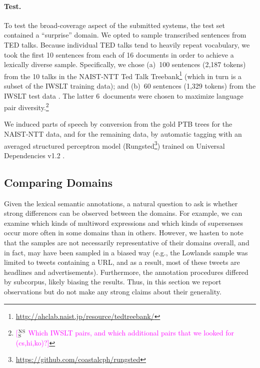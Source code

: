 \documentclass[11pt,letterpaper]{article}
\newcommand{\ensuretext}[1]{#1}
\newcommand{\nssmarker}{\ensuretext{\textcolor{magenta}{\ensuremath{^{\textsc{NS}}_{\textsc{S}}}}}}
\newcommand{\arkcomment}[3]{\ensuretext{\textcolor{#3}{[#1 #2]}}}
\newcommand{\nss}[1]{\arkcomment{\nssmarker}{#1}{magenta}}
\begin{document}
\paragraph{Test.}
To test the broad-coverage aspect of the submitted systems, the test set contained a ``surprise'' domain. 
We opted to sample transcribed sentences from TED talks. 
Because individual TED talks tend to heavily repeat vocabulary, we took the first 10 sentences 
from each of 16 documents in order to achieve a lexically diverse sample. 
Specifically, we chose 
(a)~100 sentences (2,187 tokens) from the 10 talks in the 
NAIST-NTT Ted Talk Treebank\footnote{\url{http://ahclab.naist.jp/resource/tedtreebank/}} \citep{neubig-2014naist} 
(which in turn is a subset of the IWSLT training data); 
and (b)~60 sentences (1,329 tokens) from the IWSLT test data \citep{cettolo-2012wit3}.
The latter 6~documents were chosen to maximize language pair diversity.\footnote{\nss{Which IWSLT pairs, and which additional pairs that we looked for (cs,hi,ko)?}}


We induced parts of speech by conversion from the gold PTB trees for the NAIST-NTT data, 
and for the remaining data, by automatic tagging with an averaged structured perceptron model (Rungsted\footnote{\url{https://github.com/coastalcph/rungsted}}) 
trained on Universal Dependencies v1.2 \citep{nivre-15}.

\subsection{Comparing Domains}

Given the lexical semantic annotations, 
a natural question to ask is whether strong differences can be observed between the domains.
For example, we can examine which kinds of multiword expressions and which kinds of supersenses 
occur more often in some domains than in others. 
However, we hasten to note that the samples are not necessarily representative of their domains overall, 
and in fact, may have been sampled in a biased way (e.g., the Lowlands sample was limited to tweets containing a URL, 
and as a result, most of these tweets are headlines and advertisements).
Furthermore, the annotation procedures differed by subcorpus, likely biasing the results.
Thus, in this section we report observations but do not make any strong claims about their generality.
\end{document}
